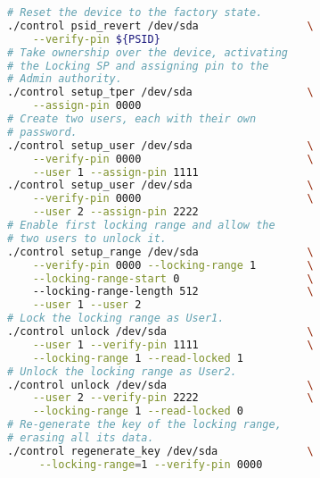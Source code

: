 



\begin{lstlisting}[language=bash,caption=Workflow with \texttt{control} utility,label={lst:control_workflow},keywordstyle=\color{black}]
# Reset the device to the factory state.
./control psid_revert /dev/sda                 \
    --verify-pin ${PSID}
# Take ownership over the device, activating 
# the Locking SP and assigning pin to the 
# Admin authority.
./control setup_tper /dev/sda                  \
    --assign-pin 0000
# Create two users, each with their own
# password.
./control setup_user /dev/sda                  \
    --verify-pin 0000                          \
    --user 1 --assign-pin 1111
./control setup_user /dev/sda                  \
    --verify-pin 0000                          \
    --user 2 --assign-pin 2222
# Enable first locking range and allow the 
# two users to unlock it.
./control setup_range /dev/sda                 \
    --verify-pin 0000 --locking-range 1        \
    --locking-range-start 0                    \ 
    --locking-range-length 512                 \
    --user 1 --user 2
# Lock the locking range as User1.
./control unlock /dev/sda                      \
    --user 1 --verify-pin 1111                 \
    --locking-range 1 --read-locked 1
# Unlock the locking range as User2.
./control unlock /dev/sda                      \
    --user 2 --verify-pin 2222                 \
    --locking-range 1 --read-locked 0
# Re-generate the key of the locking range,
# erasing all its data.
./control regenerate_key /dev/sda              \
     --locking-range=1 --verify-pin 0000
\end{lstlisting}

